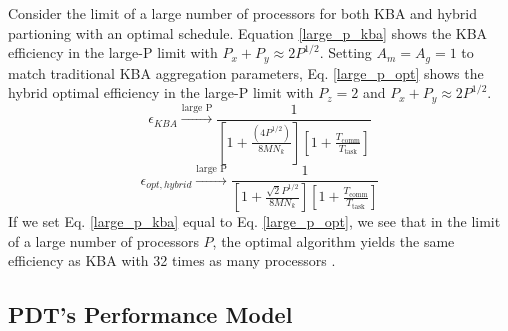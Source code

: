 \documentclass[times,final]{elsarticle}
\begin{document}
Consider the limit of a large number of processors for both KBA and hybrid partioning with an optimal schedule.
Equation \ref{large_p_kba} shows the KBA efficiency in the large-P limit with $P_x + P_y \approx 2P^{1/2}$.
Setting $A_m = A_g = 1$ to match traditional KBA aggregation parameters, Eq. \ref{large_p_opt} shows the hybrid optimal efficiency in the large-P limit with $P_z = 2$ and $P_x + P_y \approx 2P^{1/2}$.
\begin{equation}
  \epsilon_{KBA} \xrightarrow{\text{large P}} \frac{1}{[1 + \frac{(4P^{1/2})}{8MN_k}][ 1 +  \frac{T_{\text{comm}}}{T_{\text{task}}}]}
  \label{large_p_kba}
\end{equation}
\begin{equation}
  \epsilon_{opt,hybrid} \xrightarrow{\text{large P}} \frac{1}{[1 + \frac{\sqrt{2}P^{1/2}}{8MN_k}][ 1 +  \frac{T_{\text{comm}}}{T_{\text{task}}} ]}
  \label{large_p_opt}
\end{equation}
If we set Eq. \ref{large_p_kba} equal to Eq. \ref{large_p_opt}, we see that in the limit of a large number of processors $P$, the optimal algorithm yields the same efficiency as KBA with 32 times as many processors \cite{mpadams2013, mpadams2015,mpadamsjcp}.

\subsection{PDT's Performance Model}
\end{document}
